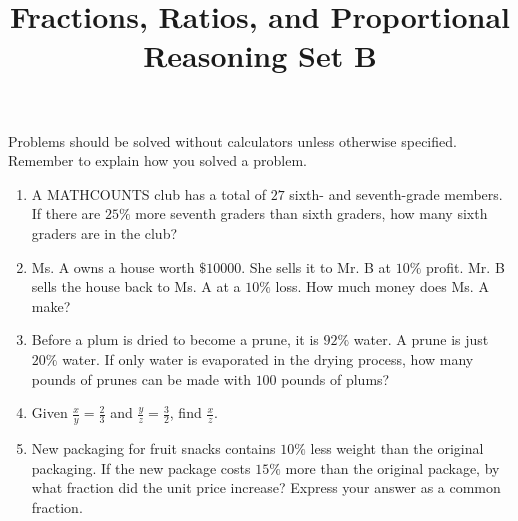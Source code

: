 \documentclass{article}
\title{Fractions, Ratios, and Proportional Reasoning Set B}
\author{}
\date{}
\begin{document}
    \maketitle
    \noindent Problems should be solved without calculators unless otherwise
    specified. Remember to explain how you solved a problem.
    \begin{enumerate}
        \item A MATHCOUNTS club has a total of $27$ sixth- and seventh-grade
        members. If there are $25\%$ more seventh graders than sixth graders,
        how many sixth graders are in the club?
        \vspace{3cm}
        \item Ms. A owns a house worth $\$10000$. She sells it to Mr. B at
        $10\%$ profit. Mr. B sells the house back to Ms. A at a $10\%$ loss. How
        much money does Ms. A make?
        \vspace{3cm}
        \item Before a plum is dried to become a prune, it is $92\%$ water. A
        prune is just $20\%$ water. If only water is evaporated in the drying
        process, how many pounds of prunes can be made with $100$ pounds of
        plums?
        \vspace{3cm}
        \item Given $\frac{x}{y} = \frac{2}{3}$ and $\frac{y}{z} = \frac{3}{2}$,
        find $\frac{x}{z}$.
        \vspace{3cm}
        \item New packaging for fruit snacks contains $10\%$ less weight than
        the original packaging. If the new package costs $15\%$ more than the
        original package, by what fraction did the unit price increase? Express
        your answer as a common fraction.
        \vspace{3cm}
    \end{enumerate}
\end{document}

